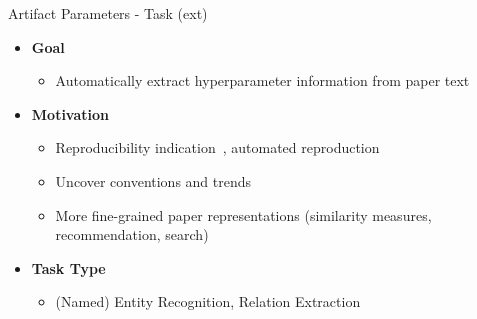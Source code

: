 \documentclass[en,16:9,smallfoot]{sdqbeamer}
\begin{document}
   \begin{frame}{Artifact Parameters - Task (ext)}
   \begin{itemize}
       \item \textbf{Goal}
       \begin{itemize}
           \item Automatically extract hyperparameter information from paper text
       \end{itemize}
       \item \textbf{Motivation}
       \begin{itemize}
           \item Reproducibility indication~\cite{Radd2019}, automated reproduction~\cite{sethi2018}
           \item Uncover conventions and trends
           \item More fine-grained paper representations (similarity measures, recommendation, search)
       \end{itemize}
       \item \textbf{Task Type}
       \begin{itemize}
           \item (Named) Entity Recognition, Relation Extraction %
       \end{itemize}
   \end{itemize}
   \end{frame}
\end{document}
